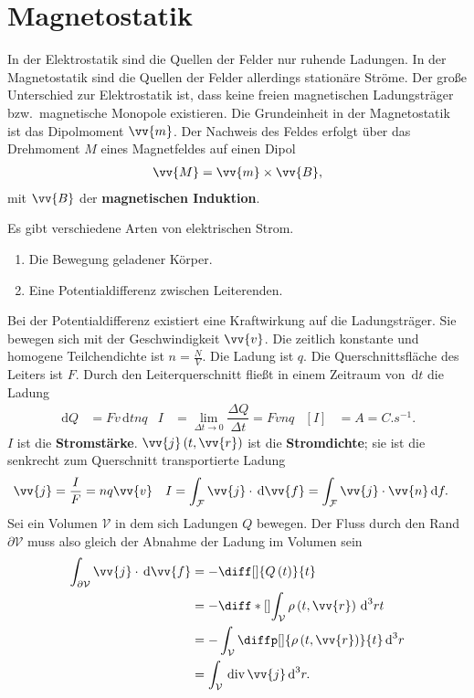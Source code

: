 \documentclass[a4paper,12pt]{article}
\newcommand{\td}{\,\text{d}}
\numberwithin{equation}{section}
\begin{document}
\section{Magnetostatik}
In der Elektrostatik sind die Quellen der Felder nur ruhende Ladungen. 
In der Magnetostatik sind die Quellen der Felder allerdings stationäre Ströme. 
Der große Unterschied zur Elektrostatik ist, dass keine freien magnetischen Ladungsträger bzw.\ magnetische Monopole existieren.
Die Grundeinheit in der Magnetostatik ist das Dipolmoment $\vv{m}$.
Der Nachweis des Feldes erfolgt über das Drehmoment $M$ eines Magnetfeldes auf einen Dipol
\begin{align} 
        \vv{M}=\vv{m}\times \vv{B}
,\end{align} 
mit $\vv{B}$ der \textbf{magnetischen Induktion}.\par
Es gibt verschiedene Arten von elektrischen Strom.
\begin{enumerate}[label=\roman*)]
        \item Die Bewegung geladener Körper.
        \item Eine Potentialdifferenz zwischen Leiterenden. 
\end{enumerate}
Bei der Potentialdifferenz existiert eine Kraftwirkung auf die Ladungsträger. Sie bewegen sich mit der Geschwindigkeit $\vv{v}$. Die zeitlich konstante und homogene Teilchendichte ist $n=\tfrac{N}{V}$. Die Ladung ist $q$. Die Querschnittsfläche des Leiters ist $F$. Durch den Leiterquerschnitt fließt in einem Zeitraum von $\td t$ die Ladung
\begin{align} 
        \td Q&=Fv\td t n q&I&=\lim_{\Delta t\rightarrow 0}\dfrac{\Delta Q}{\Delta t}=F v n q&[I]&=\unit{A}=\unit{C.s ^{-1}}
.\end{align} 
$I$ ist die \textbf{Stromstärke}. $\vv{j}\left(t,\vv{r}\right)$ ist die \textbf{Stromdichte}; sie ist die senkrecht zum Querschnitt transportierte Ladung
\begin{align} 
        \vv{j}&=\dfrac{I}{F}=nq\vv{v}&I&=\int_{\mathcal{F}}^{}\vv{j}\cdot \td \vv{f}=\int_{\mathcal{F}}^{}\vv{j}\cdot \vv{n}\td f
.\end{align} 
Sei ein Volumen $\mathcal{V}$ in dem sich Ladungen $Q$ bewegen. Der Fluss durch den Rand $\partial \mathcal{V}$ muss also gleich der Abnahme der Ladung im Volumen sein
\begin{align} 
        \int_{\partial \mathcal{V}}^{}\vv{j}\cdot \td \vv{f}&=-\diff[]{Q\left(t\right)}{t}\\
                                                            &=-\diff*[]{\int_{\mathcal{V}}^{}\rho \left(t,\vv{r}\right)\td ^3r}{t}\\
                                                            &=-\int_{\mathcal{V}}^{}\diffp[]{\rho \left(t,\vv{r}\right)}{t}\td ^3r\\
                                                            &=\int_{\mathcal{V}}^{}\,\text{div}\,\vv{j}\td ^3r
.\end{align} 
\end{document}
